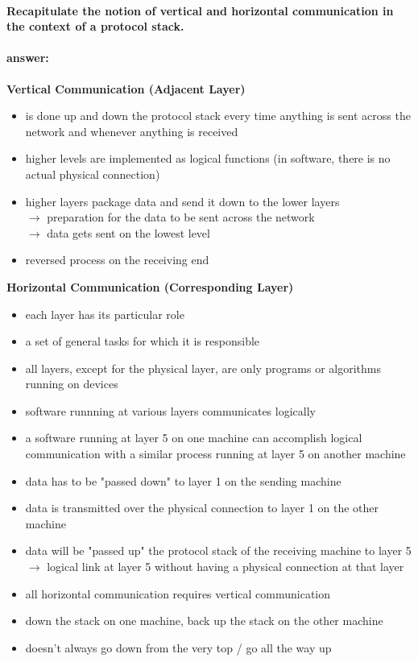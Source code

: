 \documentclass[a4paper,12pt]{article}
\begin{document}
 \paragraph{Recapitulate the notion of vertical and horizontal communication in the context of a protocol stack.}
 \paragraph{answer:}
 
  \textbf{Vertical Communication (Adjacent Layer)}
 \begin{itemize}[itemsep=0pt]
 	\item  is done up and down the protocol stack every time anything is sent across the network and whenever anything is received
 	\item  higher levels are implemented as logical functions (in software, there is no actual physical connection)
 	\item  higher layers package data and send it down to the lower layers \\
 	$\rightarrow$ preparation for the data to be sent across the network \\
 	$\rightarrow$ data gets sent on the lowest level
 	\item  reversed process on the receiving end
 \end{itemize}
  
 \textbf{Horizontal Communication (Corresponding Layer)}
 \begin{itemize}[itemsep=0pt]
 	\item  each layer has its particular role \item  a set of general tasks for which it is responsible
 	\item  all layers, except for the physical layer, are only programs or algorithms running on devices
 	\item  software runnning at various layers communicates logically
 	\item  a software running at layer 5 on one machine can accomplish logical communication with a similar process running at layer 5 on another machine
 	\item  data has to be "passed down" to layer 1 on the sending machine
 	\item  data is transmitted over the physical connection to layer 1 on the other machine
 	\item  data will be "passed up" the protocol stack of the receiving machine to layer 5 \\
 	$\rightarrow$ logical link at layer 5 without having a physical connection at that layer
 	\item  all horizontal communication requires vertical communication
 	\item  down the stack on one machine, back up the stack on the other machine
 	\item  doesn't always go down from the very top / go all the way up
 \end{itemize}
 
\end{document}
